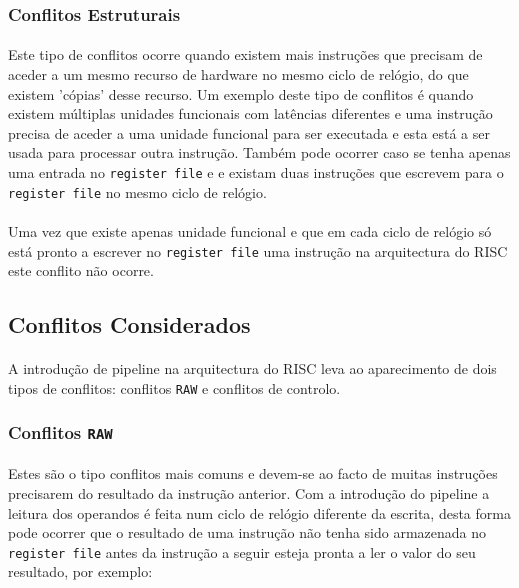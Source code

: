 \subsubsection{Conflitos Estruturais}

\paragraph{} Este tipo de conflitos ocorre quando existem mais instruções que precisam de aceder a um mesmo recurso de hardware no mesmo ciclo de relógio, do que existem 'cópias' desse recurso. Um exemplo deste tipo de conflitos é quando existem múltiplas unidades funcionais com latências diferentes e uma instrução precisa de aceder a uma unidade funcional para ser executada e esta está a ser usada para processar outra instrução. Também pode ocorrer caso se tenha apenas uma entrada no \texttt{register file} e e existam duas instruções que escrevem para o \texttt{register file} no mesmo ciclo de relógio.
\paragraph{} Uma vez que existe apenas unidade funcional e que em cada ciclo de relógio só está pronto a escrever no \texttt{register file} uma instrução na arquitectura do \textmu RISC este conflito não ocorre.

\subsection{Conflitos Considerados}

\paragraph{} A introdução de pipeline na arquitectura do \textmu RISC leva ao aparecimento de dois tipos de conflitos: conflitos \texttt{RAW} e conflitos de controlo.

\subsubsection{Conflitos \texttt{RAW}}

\paragraph{} Estes são o tipo conflitos mais comuns e devem-se ao facto de muitas instruções precisarem do resultado da instrução anterior. Com a introdução do pipeline a leitura dos operandos é feita num ciclo de relógio diferente da escrita, desta forma pode ocorrer que o resultado de uma instrução não tenha sido armazenada no \texttt{register file} antes da instrução a seguir esteja pronta a ler o valor do seu resultado, por exemplo:

